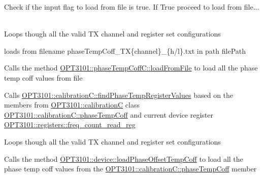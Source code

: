 \begin{DoxyItemize}
\item Check if the input flag to load from file is true. If True proceed to load from file... ~\newline
~\newline
~\newline
~\newline
~\newline
~\newline

\item Loops though all the valid TX channel and register set configurations
\item loads from filename phase\+Temp\+Coff\+\_\+\+TX\{channel\}\+\_\+\{h/l\}.txt in path file\+Path
\item Calls the method \mbox{\hyperlink{class_o_p_t3101_1_1phase_temp_coff_c_a26e1e98384b8d69f1f8bb8f3cd88071f}{O\+P\+T3101\+::phase\+Temp\+Coff\+C\+::load\+From\+File}} to load all the phase temp coff values from file
\item Calls \mbox{\hyperlink{class_o_p_t3101_1_1calibration_c_a5ca75c8e4d7818a90cacc0471522b365}{O\+P\+T3101\+::calibration\+C\+::find\+Phase\+Temp\+Register\+Values}} based on the members from \mbox{\hyperlink{class_o_p_t3101_1_1calibration_c}{O\+P\+T3101\+::calibrationC}} class \mbox{\hyperlink{class_o_p_t3101_1_1calibration_c_a277a7bbf506f5f5181719311d10bc610}{O\+P\+T3101\+::calibration\+C\+::phase\+Temp\+Coff}} and current device register \mbox{\hyperlink{class_o_p_t3101_1_1registers_a0d343738560c0bc418f34b458735a811}{O\+P\+T3101\+::registers\+::freq\+\_\+count\+\_\+read\+\_\+reg}}
\item Loops though all the valid TX channel and register set configurations
\item Calls the method \mbox{\hyperlink{class_o_p_t3101_1_1device_a71e7ec6f26d54ea7cba11bf1c4132489}{O\+P\+T3101\+::device\+::load\+Phase\+Offset\+Temp\+Coff}} to load all the phase temp coff values from the \mbox{\hyperlink{class_o_p_t3101_1_1calibration_c_a277a7bbf506f5f5181719311d10bc610}{O\+P\+T3101\+::calibration\+C\+::phase\+Temp\+Coff}} member 
\end{DoxyItemize}\mbox{\label{class_o_p_t3101_1_1device_a44f832d6edbfb26db079ddba4debfdba}} 
